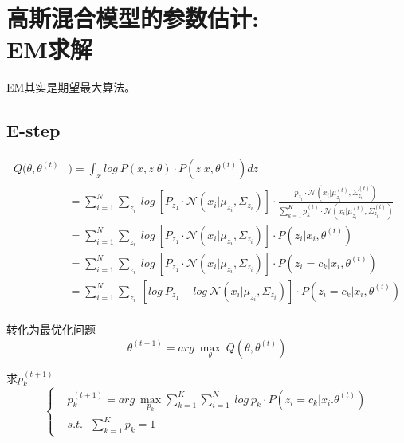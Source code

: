 \chapter{高斯混合模型的参数估计:\\EM求解}

EM其实是期望最大算法。

\section{E-step}

\begin{equation}
    \begin{aligned}
         Q(\theta,\theta^{(t)}&)=\int_{x}log\ P(x,z|\theta)\cdot P(z|x,\theta^{(t)})dz\\
        & = \sum\limits_{i=1}^{N}\sum\limits_{z_i}\ log\ [P_{z_1}\cdot \mathcal{N}(x_i|\mu_{z_i},\varSigma_{z_i})]\cdot \frac{p_{z_i}\cdot \mathcal{N}(x_i|\mu_{z_i}^{(t)},\varSigma_{z_i}^{(t)})}{\sum\limits_{k=1}^{K}p^{(t)}_k\cdot \mathcal{N}(x_i|\mu_{z_i}^{(t)},\varSigma_{z_i}^{(t)})}\\
        & = \sum\limits_{i=1}^{N}\sum\limits_{z_i}\ log\ [P_{z_1}\cdot \mathcal{N}(x_i|\mu_{z_i},\varSigma_{z_i})]\cdot P(z_i|x_i,\theta^{(t)})\\
        & = \sum\limits_{i=1}^{N}\sum\limits_{z_i}\ log\ [P_{z_1}\cdot \mathcal{N}(x_i|\mu_{z_i},\varSigma_{z_i})]\cdot P(z_i=c_k|x_i,\theta^{(t)})\\
        & = \sum\limits_{i=1}^{N}\sum\limits_{z_i}\ [log\ P_{z_1}+ log\  \mathcal{N}(x_i|\mu_{z_i},\varSigma_{z_i})]\cdot P(z_i=c_k|x_i,\theta^{(t)})\\
    \end{aligned}
\end{equation}

转化为最优化问题
\begin{equation}
    \theta^{(t+1)}=arg\ \max\limits_{\theta}\ Q(\theta,\theta^{(t)})
\end{equation}

求$p^{(t+1)}_{k}$
\begin{equation}
    \begin{cases}
        & p^{(t+1)}_{k}=arg\ \max\limits_{p_k}\sum\limits_{k=1}^{K}\sum\limits_{i=1}^{N}\ log\ p_k\cdot P(z_i=c_k|x_i.\theta^{(t)})\\
        & s.t. \ \ \ \sum\limits_{k=1}^{K}p_k=1
    \end{cases}
\end{equation}

